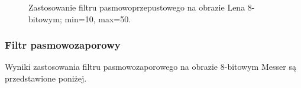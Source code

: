 \documentclass{classrep}
\begin{document}
\begin{figure}[H]
    \qquad
    \qquad
    \qquad
    \caption{Zastosowanie filtru pasmowoprzepustowego na obrazie Lena 8-bitowym; min=10, max=50.}%
\end{figure}  

\subsubsection{Filtr pasmowozaporowy}
Wyniki zastosowania filtru pasmowozaporowego na obrazie 8-bitowym Messer są przedstawione poniżej. 
\end{document}
